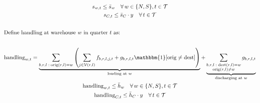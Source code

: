 \documentclass[10pt]{article}
\begin{document}
\begin{gather}
    s_{w, t}\le \bar{s}_w\quad\forall\, w\in \{N, S\}, t\in \mathcal{T}\\
    s_{C,t} \le \bar{s}_C \cdot y \quad \forall\, t \in \mathcal{T}\\
    \notag\\
    \shortintertext{Define handling at warehouse $w$ in quarter $t$ as:}\notag\\
    \text{handling}_{w,t} = 
    \underbrace{
        \sum_{\substack{b,r,l\;:\;\text{orig}(r,l)=w}}
        \left( \sum_{j \in \mathcal{V}(r,l)} f_{b,r,l,j,t} + g_{b,r,l,t}\mathbbm{1}[\text{orig}\neq\text{dest}] \right)
    }_{\text{loading at } w}
    +
    \underbrace{
        \sum_{\substack{b,r,l\;:\;\text{dest}(r,l)=w \\ \text{orig}(r,l) \neq w}}
        g_{b,r,l,t}
    }_{\text{discharging at } w}\\
    \text{handling}_{w,t} \le \bar{h}_w
    \quad \forall\, w \in \{N, S\}, t \in \mathcal{T}\\
    \text{handling}_{C,t} \le \bar{h}_C \cdot y \quad \forall\, t \in \mathcal{T}
\end{gather}
\newpage 
\end{document}
